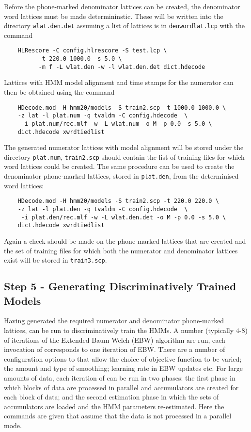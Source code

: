 Before the phone-marked denominator lattices can be created, the denominator word lattices must 
be made determininstic. These will be written into the directory \texttt{wlat.den.det} assuming a list of lattices
is in \texttt{denwordlat.lcp} with the command
\begin{verbatim}
    HLRescore -C config.hlrescore -S test.lcp \
          -t 220.0 1000.0 -s 5.0 \
          -m f -L wlat.den -w -l wlat.den.det dict.hdecode
\end{verbatim}
Lattices with HMM model alignment and time stamps for the numerator can then be obtained using the command
\begin{verbatim}
    HDecode.mod -H hmm20/models -S train2.scp -t 1000.0 1000.0 \
    -z lat -l plat.num -q tvaldm -C config.hdecode  \
     -i plat.num/rec.mlf -w -L wlat.num -o M -p 0.0 -s 5.0 \
    dict.hdecode xwrdtiedlist
\end{verbatim}
The generated numerator lattices with model alignment will be stored under the directory
\texttt{plat.num}, \texttt{train2.scp} should contain the list of training files for which word lattices could
be created. The same procedure can be used to create the denominator phone-marked lattices, stored in
\texttt{plat.den}, from the determinised word lattices:
\begin{verbatim}
    HDecode.mod -H hmm20/models -S train2.scp -t 220.0 220.0 \
    -z lat -l plat.den -q tvaldm -C config.hdecode  \
     -i plat.den/rec.mlf -w -L wlat.den.det -o M -p 0.0 -s 5.0 \
    dict.hdecode xwrdtiedlist
\end{verbatim}
Again a check should be made on the phone-marked lattices that are created and the set of training
files for which both the numerator and denominator lattices exist will be stored in \texttt{train3.scp}.

\subsection{Step 5 - Generating Discriminatively Trained Models} 

Having generated the required numerator and denominator phone-marked lattices,
 can be run to discriminatively train the HMMs.
A number (typically 4-8) of iterations of the Extended Baum-Welch (EBW)
algorithm are run, each invocation of \htool{HMMIRest} corresponds to one iteration of
EBW.  There are a number of configuration options to \htool{HMMIRest} that
allow the choice of objective function to be varied; the amount and type of
smoothing; learning rate in EBW updates etc. For large amounts of data, each
iteration of \htool{HMMIRest} can be run in two phases: the first phase in
which blocks of data are processed in parallel and accumulators are created
for each block of data; and the second estimation phase in which the sets of
accumulators are loaded and the HMM parameters re-estimated.  Here the
commands are given that assume that the data is not processed in a parallel
mode.

